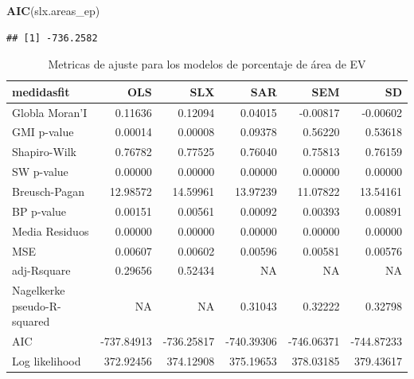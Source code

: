 \documentclass[12pt,]{book}
\newenvironment{Shaded}{\begin{snugshade}}{\end{snugshade}}
\newcommand{\KeywordTok}[1]{\textcolor[rgb]{0.13,0.29,0.53}{\textbf{#1}}}
\newcommand{\NormalTok}[1]{#1}
\begin{document}
\begin{Shaded}
\begin{Highlighting}[]
\KeywordTok{AIC}\NormalTok{(slx.areas_ep)}
\end{Highlighting}
\end{Shaded}

\begin{verbatim}
## [1] -736.2582
\end{verbatim}

\begin{table}

\caption{\label{tab:tabla-comp-modelos-areaep}Metricas de ajuste para los modelos de porcentaje de área de EV}
\centering
\begin{tabular}[t]{l|r|r|r|r|r}
\hline
medidasfit & OLS & SLX & SAR & SEM & SD\\
\hline
Globla Moran'I & 0.11636 & 0.12094 & 0.04015 & -0.00817 & -0.00602\\
\hline
GMI p-value & 0.00014 & 0.00008 & 0.09378 & 0.56220 & 0.53618\\
\hline
Shapiro-Wilk & 0.76782 & 0.77525 & 0.76040 & 0.75813 & 0.76159\\
\hline
SW p-value & 0.00000 & 0.00000 & 0.00000 & 0.00000 & 0.00000\\
\hline
Breusch-Pagan & 12.98572 & 14.59961 & 13.97239 & 11.07822 & 13.54161\\
\hline
BP p-value & 0.00151 & 0.00561 & 0.00092 & 0.00393 & 0.00891\\
\hline
Media Residuos & 0.00000 & 0.00000 & 0.00000 & 0.00000 & 0.00000\\
\hline
MSE & 0.00607 & 0.00602 & 0.00596 & 0.00581 & 0.00576\\
\hline
adj-Rsquare & 0.29656 & 0.52434 & NA & NA & NA\\
\hline
Nagelkerke pseudo-R-squared & NA & NA & 0.31043 & 0.32222 & 0.32798\\
\hline
AIC & -737.84913 & -736.25817 & -740.39306 & -746.06371 & -744.87233\\
\hline
Log likelihood & 372.92456 & 374.12908 & 375.19653 & 378.03185 & 379.43617\\
\hline
\end{tabular}
\end{table}
\end{document}
